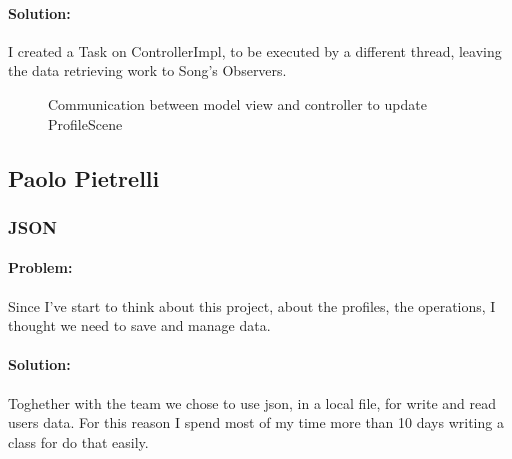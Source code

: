 \documentclass[a4paper,12pt]{report}
\begin{document}
        \paragraph{Solution:}I created a Task on ControllerImpl, to be executed by a different thread, leaving the data retrieving work to Song's Observers.
            \begin{figure}[H]
                \caption{Communication between model view and controller to update ProfileScene}
                \label{fig:my_label}
            \end{figure}

\subsection{Paolo Pietrelli}

	\subsubsection{JSON}
		\paragraph{Problem:}Since I've start to think about this project,  about the profiles, the operations, I thought we need to save and manage data. 
		\paragraph{Solution:}Toghether with the team we chose to use json, in a local file, for write and read users data. For this reason I spend most of my time more than 10 days writing a class for do that easily.
		
\end{document}

